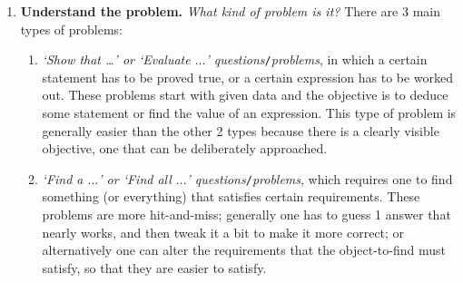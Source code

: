 \documentclass{article}
\numberwithin{equation}{section}
\begin{document}
\begin{enumerate}
	\item \textbf{Understand the problem.} \textit{What kind of problem is it?} There are 3 main types of problems:
	\begin{enumerate}
		\item \textit{`Show that \ldots' or `Evaluate $\ldots$' questions}\texttt{/}\textit{problems}, in which a certain statement has to be proved true, or a certain expression has to be worked out. These problems start with given data and the objective is to deduce some statement or find the value of an expression. This type of problem is generally easier than the other 2 types because there is a clearly visible objective, one that can be deliberately approached.
		\item \textit{`Find a $\ldots$' or `Find all $\ldots$' questions}\texttt{/}\textit{problems}, which requires one to find something (or everything) that satisfies certain requirements. These problems are more hit-and-miss; generally one has to guess 1 answer that nearly works, and then tweak it a bit to make it more correct; or alternatively one can alter the requirements that the object-to-find must satisfy, so that they are easier to satisfy.
		

\end{enumerate}
\end{enumerate}
\end{document}
